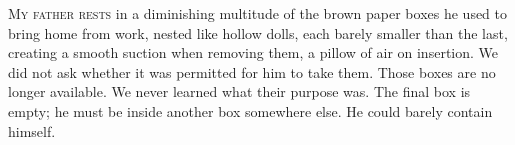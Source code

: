 
\lettrine{M}{y father rests}
in a diminishing multitude of the brown paper boxes he
used to bring home from work, nested like hollow dolls, each barely
smaller than the last, creating a smooth suction when removing them, a
pillow of air on insertion. We did not ask whether it was permitted for
him to take them. Those boxes are no longer available. We never learned
what their purpose was. The final box is empty; he must be inside
another box somewhere else. He could barely contain himself.

